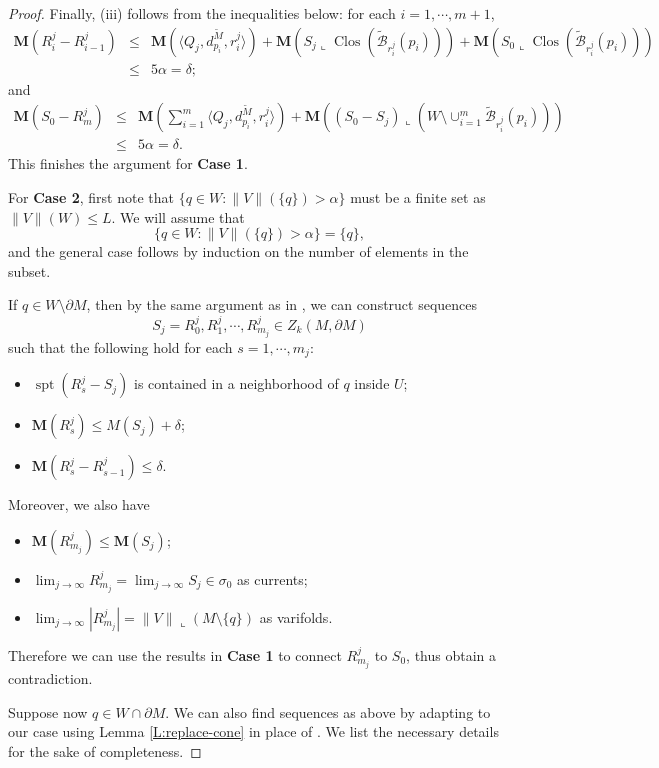\documentclass[10pt]{amsart}
\theoremstyle{definition}
\theoremstyle{remark}
\numberwithin{equation}{section}
\newcommand{\al}{\alpha}
\newcommand{\lan}{\langle}
\newcommand{\ran}{\rangle}
\newcommand{\lc}{\llcorner}
\newcommand{\si}{\sigma}
\newcommand{\de}{\delta}
\newcommand{\M}{\mathbf{M}}
\newcommand{\tM}{\widetilde{M}}
\newcommand{\tBcal}{\widetilde{\mathcal{B}}}
\newcommand{\spt}{\operatorname{spt}}
\newcommand{\Clos}{\operatorname{Clos}}
\begin{document}
\begin{proof}
Finally, (iii) follows from the inequalities below: for each $i=1,\cdots,m+1$,
\begin{eqnarray*}
\M(R^j_i-R^j_{i-1}) & \leq & \M(\lan Q_j, d^{\tM}_{p_i}, r^j_i\ran) +\M (S_j\lc \Clos(\tBcal_{r_i^j}(p_i)))+ \M (S_0\lc\Clos(\tBcal_{r_i^j}(p_i)))\\
                                     & \leq & 5\al=\de; 
\end{eqnarray*}
and
\begin{eqnarray*}
\M(S_0-R^j_m) &\leq & \M\left(\sum_{i=1}^m\lan Q_j, d^{\tM}_{p_i}, r^j_i\ran \right) +\M\left((S_0-S_j)\lc (W\setminus \cup_{i=1}^m \tBcal_{r_i^j}(p_i))\right)\\
                              & \leq & 5\al=\de.
\end{eqnarray*}
This finishes the argument for \textbf{Case 1}.


For \textbf{Case 2}, first note that $\{q\in W: \|V\|(\{q\})> \al\}$ must be a finite set as $\|V\|(W)\leq L$.  We will assume that 
\[ \{q\in W: \|V\|(\{q\})> \al\}=\{q\},\]
and the general case follows by induction on the number of elements in the subset.  

If $q\in W \setminus \partial M$, then by the same argument as in \cite[Lemma 3.7, page 118-121]{Pitts}, we can construct sequences 
\[ S_j=R^j_0, R^j_1, \cdots, R^j_{m_j} \in Z_k(M,\partial M)\]
such that the following hold for each $s=1,\cdots,m_j$:
\begin{itemize}
\item $\spt(R^j_s-S_j)$ is contained in a neighborhood of $q$ inside $U$;
\item $\M(R^j_s)\leq M(S_j)+\de$;
\item $\M(R^j_s-R^j_{s-1})\leq \de$.
\end{itemize}
Moreover, we also have
\begin{itemize}
\item $\M(R^j_{m_j})\leq \M(S_j)$;
\item $\lim_{j\rightarrow \infty}R^j_{m_j}=\lim_{j\rightarrow \infty}S_j\in \si_0$ as currents;
\item $\lim_{j\rightarrow \infty}|R^j_{m_j}|=\|V\|\lc (M\setminus\{q\})$ as varifolds.
\end{itemize}
Therefore we can use the results in {\bf Case 1} to connect $R^j_{m_j}$ to $S_0$, thus obtain a contradiction.

Suppose now $q\in W\cap\partial M$.  We can also find sequences as above by adapting \cite[Lemma 3.7, page 118-121]{Pitts} to our case using Lemma \ref{L:replace-cone} in place of \cite[Lemma 3.5]{Pitts}. We list the necessary details for the sake of completeness.  


\end{proof}
\end{document}

